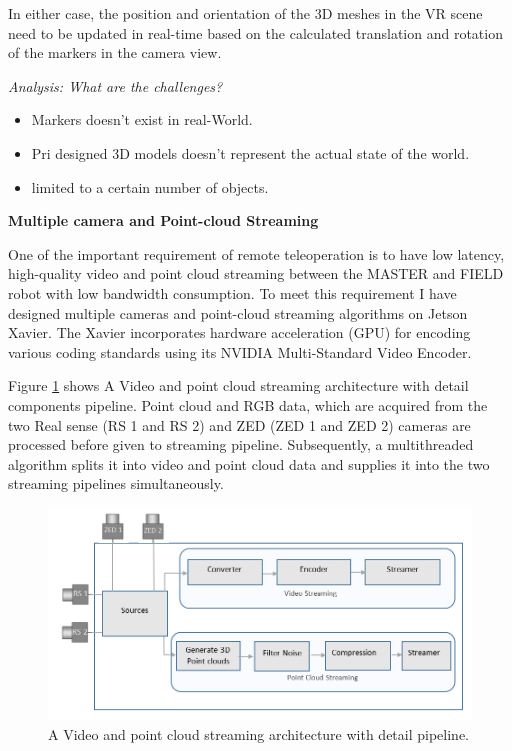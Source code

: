 In either case, the position and orientation of the 3D meshes in the VR scene need to be updated in real-time based on the calculated translation and rotation of the markers in the camera view.

\textit{Analysis: What are the challenges?}
\begin{itemize}
    \item Markers doesn't exist in real-World.
    \item Pri designed 3D models doesn't represent the actual state of the world.
    \item limited to a certain number of objects.
\end{itemize}


\textbf{Multiple camera and Point-cloud Streaming}

One of the important requirement of remote teleoperation is to have low latency, high-quality video and point cloud streaming between the MASTER and FIELD robot with low bandwidth consumption. To meet this requirement I have designed multiple cameras and point-cloud streaming algorithms on Jetson Xavier. The Xavier incorporates hardware acceleration (GPU) for encoding various coding standards using its NVIDIA Multi-Standard Video Encoder.

Figure \ref{fig:StreamingPipe} shows A Video and point cloud streaming architecture with detail components pipeline. Point cloud and RGB data, which are acquired from the two Real sense (RS 1 and RS 2) and ZED (ZED 1 and ZED 2) cameras are processed before given to streaming pipeline. Subsequently, a multithreaded algorithm splits it into video and point cloud data and supplies it into the two streaming pipelines simultaneously. 

\begin{figure}[h]
    \centering
    \includegraphics[scale=0.5]{images/Video_Point_Streaming.PNG}
    \caption{A Video and point cloud streaming architecture with detail pipeline.}
    \label{fig:StreamingPipe}
\end{figure}\\


